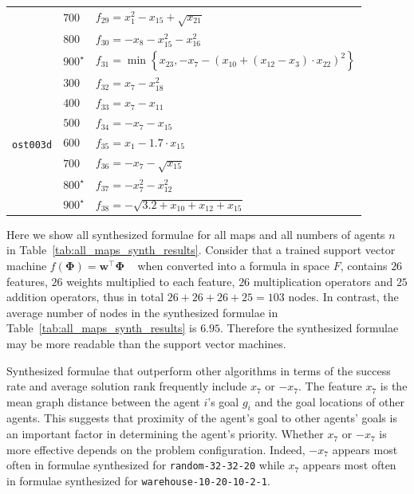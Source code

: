 \begin{table}[t!]
{\begin{tabular}{c|l|l}
            & $ 700 $ & $ f_{29} = x_{1}^2 - x_{15} + \sqrt{x_{21}} $ \\
            & $ 800 $ & $ f_{30} = -x_{8} - x_{15}^2 - x_{16}^2 $ \\
            & $ 900^\star $ & $ f_{31} = \min\left\{x_{23}, -x_{7} - \left(x_{10} + \left(x_{12} - x_{3}\right) \cdot x_{22}\right)^2\right\} $ \\
            \hline
            \multirow{7}{*}{\begin{turn}{90} {\tt ost003d} \end{turn}}
            & $ 300 $ & $ f_{32} = x_{7} - x_{18}^2 $ \\
            & $ 400 $ & $ f_{33} = x_{7} - x_{11} $ \\
            & $ 500 $ & $ f_{34} = -x_{7} - x_{15} $ \\
            & $ 600 $ & $ f_{35} = x_{1} - 1.7 \cdot x_{15} $ \\
            & $ 700 $ & $ f_{36} = -x_{7} -\sqrt{x_{15}} $ \\
            & $ 800^\star $ & $ f_{37} = - x_{7}^2 - x_{12}^2 $ \\
            & $ 900^\star $ & $ f_{38} = -\sqrt{3.2 + x_{10} + x_{12} + x_{15}} $ \\ \bottomrule
        \end{tabular}}
\end{table}

Here we show all synthesized formulae for all maps and all numbers of agents $ n $ in Table~\ref{tab:all_maps_synth_results}. Consider that a trained support vector machine $ f(\mathbf{\Phi}) = \mathbf{w}^\intercal \mathbf{\Phi} $ ~\citep{zhang2022learning} when converted into a formula in space $ F $, contains $ 26 $ features, $ 26 $ weights multiplied to each feature, $ 26 $ multiplication operators and $ 25 $ addition operators, thus in total $ 26 + 26 + 26 + 25 = 103 $ nodes. In contrast, the average number of nodes in the synthesized formulae in Table~\ref{tab:all_maps_synth_results} is $ 6.95 $. Therefore the synthesized formulae may be more readable than the support vector machines.

Synthesized formulae that outperform other algorithms in terms of the success rate and average solution rank frequently include $ x_7 $ or $ -x_{7} $. The feature $ x_7 $ is the mean graph distance between the agent $ i $'s goal $ g_i $ and the goal locations of other agents. This suggests that proximity of the agent's goal to other agents' goals is an important factor in determining the agent's priority. Whether $ x_7 $ or $ -x_7 $ is more effective depends on the problem configuration. Indeed, $ -x_7 $ appears most often in formulae synthesized for {\tt random-32-32-20} while $ x_7 $ appears most often in formulae synthesized for {\tt warehouse-10-20-10-2-1}.

